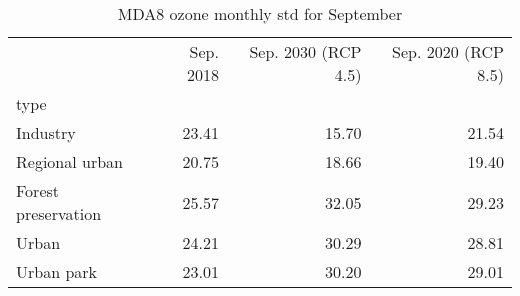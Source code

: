 \begin{table}
\centering
\caption{MDA8 ozone monthly std for September}
\label{o3_sep_type}
\begin{tabular}{lrrr}
\toprule
{} &  Sep. 2018 &  Sep. 2030 (RCP 4.5) &  Sep. 2020 (RCP 8.5) \\
type                &            &                      &                      \\
\midrule
Industry            &      23.41 &                15.70 &                21.54 \\
Regional urban      &      20.75 &                18.66 &                19.40 \\
Forest preservation &      25.57 &                32.05 &                29.23 \\
Urban               &      24.21 &                30.29 &                28.81 \\
Urban park          &      23.01 &                30.20 &                29.01 \\
\bottomrule
\end{tabular}
\end{table}

